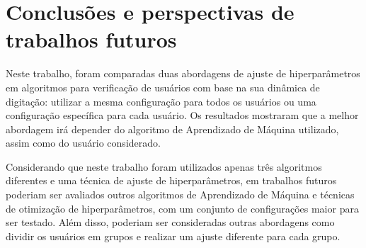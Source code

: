 \section{Conclusões e perspectivas de trabalhos futuros}\label{sec:conclusao}

Neste trabalho, foram comparadas duas abordagens de ajuste de hiperparâmetros em algoritmos para verificação de usuários com base na sua dinâmica de digitação: utilizar a mesma configuração para todos os usuários ou uma configuração específica para cada usuário. Os resultados mostraram que a melhor abordagem irá depender do algoritmo de Aprendizado de Máquina utilizado, assim como do usuário considerado.

Considerando que neste trabalho foram utilizados apenas três algoritmos diferentes e uma técnica de ajuste de hiperparâmetros, em trabalhos futuros poderiam ser avaliados outros algoritmos de Aprendizado de Máquina e técnicas de otimização de hiperparâmetros, com um conjunto de configurações maior para ser testado. Além disso, poderiam ser consideradas outras abordagens como dividir os usuários em grupos e realizar um ajuste diferente para cada grupo.

